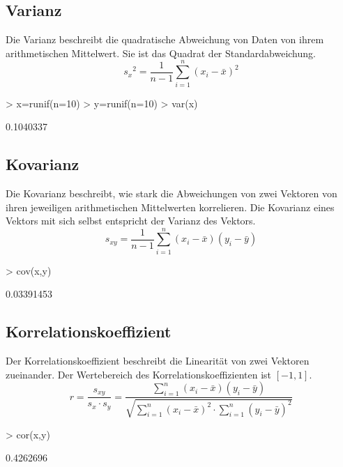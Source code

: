 \subsection{Varianz}
Die Varianz beschreibt die quadratische Abweichung von Daten von ihrem 
arithmetischen Mittelwert. Sie ist das Quadrat der Standardabweichung. 
\[ {s_x}^2 = \frac{1}{n-1} \sum\limits_{i=1}^{n} (x_i - \bar{x})^2 \]
\begin{Schunk}
\begin{Sinput}
> x=runif(n=10)
> y=runif(n=10)
> var(x)
\end{Sinput}
\begin{Soutput}
[1] 0.1040337
\end{Soutput}
\end{Schunk}

\subsection{Kovarianz}
Die Kovarianz beschreibt, wie stark die Abweichungen von zwei Vektoren von 
ihren jeweiligen arithmetischen Mittelwerten korrelieren. Die Kovarianz 
eines Vektors mit sich selbst entspricht der Varianz des Vektors. 
\[ s_{xy} 
= \frac{1}{n-1} \sum\limits_{i=1}^{n} (x_i - \bar{x}) (y_i - \bar{y}) \]
\begin{Schunk}
\begin{Sinput}
> cov(x,y)
\end{Sinput}
\begin{Soutput}
[1] 0.03391453
\end{Soutput}
\end{Schunk}

\subsection{Korrelationskoeffizient}
Der Korrelationskoeffizient beschreibt die Linearität von zwei Vektoren 
zueinander. Der Wertebereich des Korrelationskoeffizienten ist $[-1, 1]$. 
\[ r = \frac{s_{xy}}{s_x \cdot s_y} 
= \frac{\sum\limits_{i=1}^{n} (x_i - \bar{x}) (y_i - \bar{y})}
{\sqrt{\sum\limits_{i=1}^{n} (x_i - \bar{x})^2  \cdot 
\sum\limits_{i=1}^{n} (y_i - \bar{y})^2 }} \]
\begin{Schunk}
\begin{Sinput}
> cor(x,y)
\end{Sinput}
\begin{Soutput}
[1] 0.4262696
\end{Soutput}
\end{Schunk}

